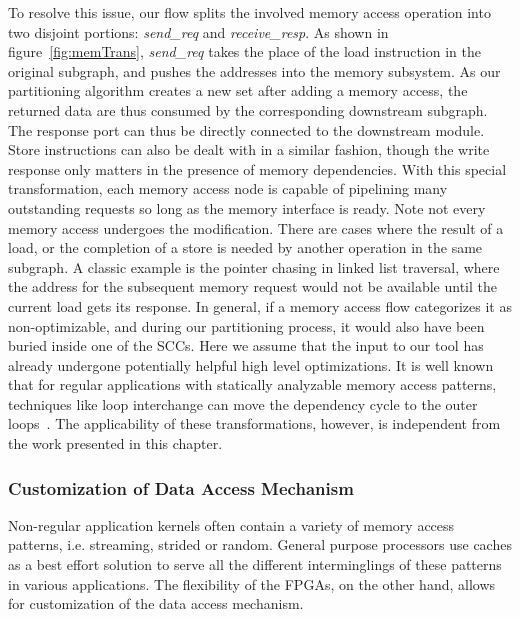 To resolve this issue, our flow splits the involved
memory access operation into two disjoint portions:
\textit{send\_req} and \textit{receive\_resp}. %
As shown in figure~\ref{fig:memTrans}, \textit{send\_req}%
 takes the place of the load instruction in the original subgraph,
and pushes the addresses into the memory subsystem. %
As our partitioning
algorithm creates a new set 
after adding a memory
access, the returned data are %
thus consumed by the corresponding downstream subgraph.
The response port can thus be directly connected to the downstream module.
Store instructions can also be dealt with in a similar fashion, though
the write response only matters in the presence of memory dependencies. 
With this special transformation, each
memory access node is capable of pipelining many outstanding
requests so long as the memory interface is ready.
Note not every memory access undergoes the modification.
There are cases where the result of a load, or the completion of
a store is needed by another operation in the same subgraph.
A classic example is the pointer
chasing in linked list traversal, where the address for the
subsequent memory request would not be available until the
current load gets its response. In general, if a memory access
flow categorizes it as non-optimizable, and during our partitioning process,
it would also have been buried inside one of the SCCs. Here we assume that
the input to our tool has already undergone potentially helpful
high level optimizations. It is well known that for regular
applications with statically analyzable memory access patterns,
techniques like loop interchange can move the dependency
cycle to the outer loops~\cite{Kennedy:2001:OCM:502981}. The applicability of these
transformations, however, is independent from the work presented in this chapter.


\subsubsection{Customization of Data Access Mechanism}
Non-regular application kernels often contain a variety of
memory access patterns, i.e. streaming, strided or random.
General purpose processors use caches as a best effort solution
to serve all the different interminglings of these patterns in
various applications. The flexibility of the FPGAs, on the other
hand, allows for customization of the data access mechanism.




